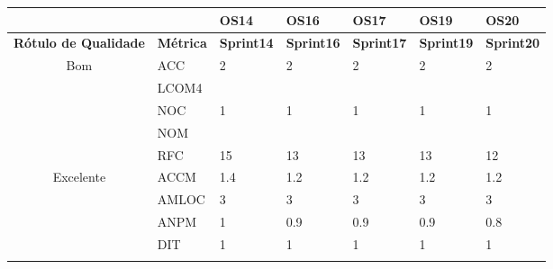 \begin{table}[H]
\begin{tabular}{|c|l|l|l|l|l|l|}
\hline
\multicolumn{1}{|l|}{\textbf{}}                    & \textbf{}        & \textbf{OS14}      & \textbf{OS16}      & \textbf{OS17}      & \textbf{OS19}      & \textbf{OS20}      \\ \hline
\multicolumn{1}{|l|}{\textbf{Rótulo de Qualidade}} & \textbf{Métrica} & \textbf{Sprint14} & \textbf{Sprint16} & \textbf{Sprint17} & \textbf{Sprint19} & \textbf{Sprint20} \\ \hline
\multirow{5}{*}{Bom}                               & ACC              & 2                  & 2                  & 2                  & 2                  & 2                  \\ \cline{2-7} 
                                                   & LCOM4            &                    &                    &                    &                    &                    \\ \cline{2-7} 
                                                   & NOC              & 1                  & 1                  & 1                  & 1                  & 1                  \\ \cline{2-7} 
                                                   & NOM              &                    &                    &                    &                    &                    \\ \cline{2-7} 
                                                   & RFC              & 15                 & 13                 & 13                 & 13                 & 12                 \\ \hline
\multirow{7}{*}{Excelente}                         & ACCM             & 1.4                & 1.2                & 1.2                & 1.2                & 1.2                \\ \cline{2-7} 
                                                   & AMLOC            & 3                  & 3                  & 3                  & 3                  & 3                  \\ \cline{2-7} 
                                                   & ANPM             & 1                  & 0.9                & 0.9                & 0.9                & 0.8                \\ \cline{2-7} 
                                                   & DIT              & 1                  & 1                  & 1                  & 1                  & 1                  \\ \cline{2-7} 

\end{tabular}
\end{table}
